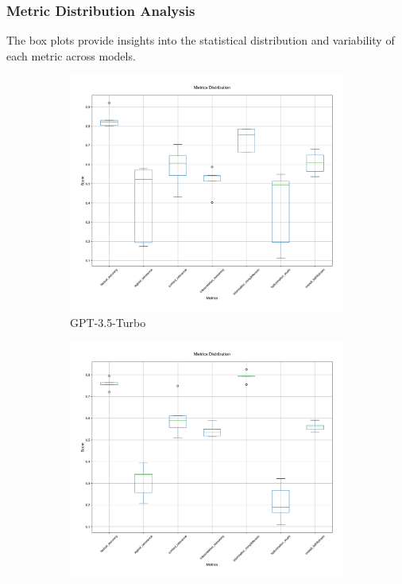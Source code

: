 \subsubsection{Metric Distribution Analysis}
The box plots provide insights into the statistical distribution and variability of each metric across models.

\begin{figure}[!htbp]
\centering
\begin{subfigure}[b]{0.32\textwidth}
    \includegraphics[width=\textwidth]{figures/visualization/metrics_boxplot_gpt-3.5-turbo.png}
    \caption{GPT-3.5-Turbo}
    \label{fig:metrics_boxplot_gpt35}
\end{subfigure}
\hfill
\begin{subfigure}[b]{0.32\textwidth}
    \includegraphics[width=\textwidth]{figures/visualization/metrics_boxplot_gpt-4-turbo.png}

\end{subfigure}
\end{figure}
